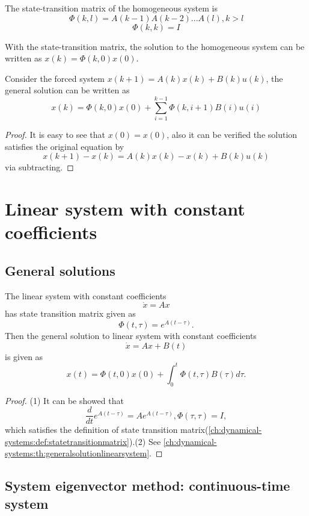 \begin{refsection}
\begin{definition}
\cite[100]{luenberger1979introduction} The state-transition matrix of the homogeneous system is
$$\Phi(k,l) = A(k-1)A(k-2)...A(l),k>l$$
$$\Phi(k,k) = I$$
\end{definition}

\begin{remark}
With the state-transition matrix, the solution to the homogeneous system can be written as $x(k) = \Phi(k,0)x(0)$.
\end{remark}

\begin{theorem}
\cite[109]{luenberger1979introduction}Consider the forced system $x(k+1)=A(k)x(k)+B(k)u(k)$, the general solution can be written as
$$x(k) = \Phi(k,0)x(0) + \sum_{i=1}^{k-1} \Phi(k,i+1)B(i)u(i)$$
\end{theorem}
\begin{proof}
It is easy to see that $x(0)=x(0)$, also it can be verified the solution satisfies the original equation by
$$x(k+1)-x(k) = A(k)x(k)-x(k) + B(k)u(k)$$
via subtracting.
\end{proof}


\section{Linear system with constant coefficients}
\subsection{General solutions}
\begin{theorem}\label{ch:dynamical-systems:th:generalsolutionlinearsystemconstantcoeff}
The linear system with constant coefficients
$$\dot{x} = Ax$$
has state transition matrix given as
$$\Phi(t,\tau) = e^{A(t-\tau)}.$$
Then the general solution to  linear system with constant coefficients
$$\dot{x} = Ax + B(t)$$
is given as
$$x(t) = \Phi(t,0)x(0) + \int_0^t \Phi(t,\tau)B(\tau)d\tau.$$	
\end{theorem}
\begin{proof}
(1) It can be showed that $$\frac{d}{dt}e^{A(t-\tau)} = Ae^{A(t-\tau)},\Phi(\tau,\tau)=I,$$ which satisfies the definition of state transition matrix(\autoref{ch:dynamical-systems:def:statetransitionmatrix}).(2) See \autoref{ch:dynamical-systems:th:generalsolutionlinearsystem}.
\end{proof}


\subsection{System eigenvector method: continuous-time system}

\end{refsection}
